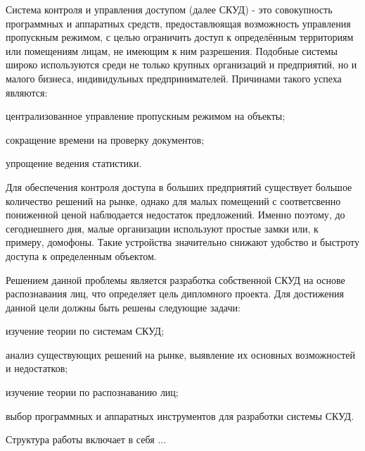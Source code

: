 Система контроля и управления доступом (далее СКУД) - это совокупность программных и аппаратных средств, предоставлюящая возможность управления пропускным режимом, с целью ограничить доступ к определённым территориям или помещениям лицам, не имеющим к ним разрешения. Подобные системы широко используются среди не только крупных организаций и предприятий, но и малого бизнеса, индивидульных предпринимателей. Причинами такого успеха являются:

\begin{itemize*}
\item централизованное управление пропускным режимом на объекты;
\item сокращение времени на проверку документов;
\item упрощение ведения статистики.
\end{itemize*}

Для обеспечения контроля доступа в больших предприятий существует большое количество решений на рынке, однако для малых помещений с соответсвенно пониженной ценой наблюдается недостаток предложений. Именно поэтому, до сегоднешнего дня, малые организации используют простые замки или, к примеру, домофоны. Такие устройства значительно снижают удобство и быстроту доступа к определенным объектом. 

Решением данной проблемы является разработка собственной СКУД на основе распознавания лиц, что определяет цель дипломного проекта. Для достижения данной цели должны быть решены следующие задачи:

\begin{itemize*}
\item изучение теории по системам СКУД;
\item анализ существующих решений на рынке, выявление их основных возможностей и недостатков;
\item изучение теории по распознаванию лиц;
\item выбор программных и аппаратных инструментов для разработки системы СКУД.
\end{itemize*}

Структура работы включает в себя ...
